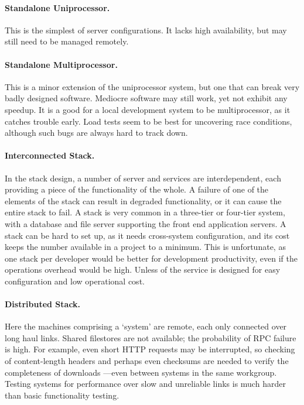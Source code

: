 \documentclass[draft]{report}
\begin{document}
\paragraph{Standalone Uniprocessor.}

This is the simplest of server configurations. It lacks high
availability, but may still need to be managed remotely.

\paragraph{Standalone Multiprocessor.}

This is a minor extension of the uniprocessor system, but one that can
break very badly designed software. Mediocre software may still work,
yet not exhibit any speedup. It is a good for a local development system
to be multiprocessor, as it catches trouble early. Load tests seem to be
best for uncovering race conditions, although such bugs are always hard
to track down.

\paragraph{Interconnected Stack.}

In the stack design, a number of server and services are interdependent,
each providing a piece of the functionality of the whole. A failure of
one of the elements of the stack can result in degraded functionality,
or it can cause the entire stack to fail. A stack is very common in a
three-tier or four-tier system, with a database and file server
supporting the front end application servers. A stack can be hard to set
up, as it needs cross-system configuration, and its cost keeps the
number available in a project to a minimum. This is unfortunate, as one
stack per developer would be better for development productivity, even
if the operations overhead would be high. Unless of the service is
designed for easy configuration and low operational cost.

\paragraph{Distributed Stack.}

Here the machines comprising a `system' are remote, each only connected
over long haul links. Shared filestores are not available; the
probability of RPC failure is high. For example, even short HTTP
requests may be interrupted, so checking of content-length headers and
perhaps even checksums are needed to verify the completeness of
downloads ---even between systems in the same workgroup. Testing systems
for performance over slow and unreliable links is much harder than basic
functionality testing.
\end{document}

